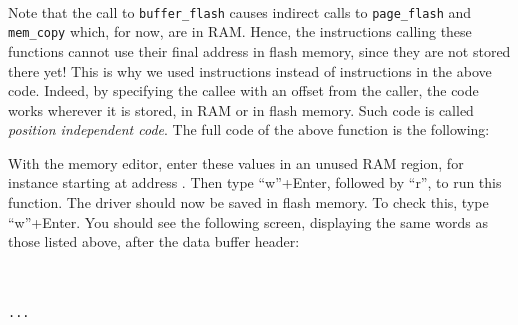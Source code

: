 \begin{TwoColumns}
\\
\end{TwoColumns}

Note that the call to \verb!buffer_flash! causes indirect calls to
\verb!page_flash! and \verb!mem_copy! which, for now, are in RAM. Hence, the
instructions calling these functions cannot use their final address in flash
memory, since they are not stored there yet! This is why we used 
instructions instead of  instructions in the above code. Indeed, by
specifying the callee with an offset from the caller, the code works wherever
it is stored, in RAM or in flash memory. Such code is called {\em position
independent code}. The full code of the above function is the following:



\noindent With the memory editor, enter these values in an unused RAM region,
for instance starting at address . Then type
``w''+Enter, followed by ``r'', to run this
function. The driver should now be saved in flash memory. To check this, type
``w''+Enter. You should see the following
screen, displaying the same words as those listed above, after the data buffer
header:



\begin{Paragraph}
\\
\\
{\tt ...}
\end{Paragraph}


